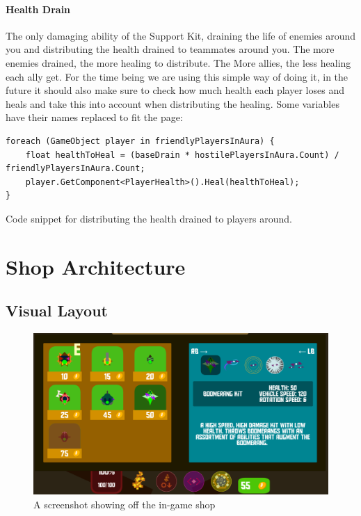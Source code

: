 \paragraph{Health Drain}
The only damaging ability of the Support Kit, draining the life of enemies around you and distributing the health drained to teammates around you. The more enemies drained, the more healing to distribute. The More allies, the less healing each ally get. For the time being we are using this simple way of doing it, in the future it should also make sure to check how much health each player loses and heals and take this into account when distributing the healing. Some variables have their names replaced to fit the page:

\begin{listing}[htb]
\begin{verbatim}
foreach (GameObject player in friendlyPlayersInAura) {
    float healthToHeal = (baseDrain * hostilePlayersInAura.Count) / friendlyPlayersInAura.Count;
    player.GetComponent<PlayerHealth>().Heal(healthToHeal);
}
\end{verbatim}
\caption[Health Drain distributing health]{Code snippet for distributing the health drained to players around.}
\label{listing:supportHealthDrain}
\end{listing}

\section{Shop Architecture}
\subsection{Visual Layout}
\begin{figure}[tbph]  %
  \centering
  \includegraphics[width=.75\textwidth]{images/shopOverview}
  \caption[Screenshot showing off the in-game shop]{A screenshot showing off the in-game shop}
  \label{fig:shopOverview}
\end{figure}

